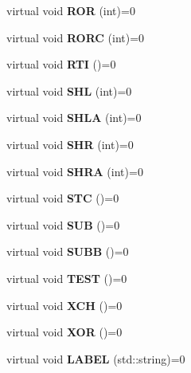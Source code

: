 \begin{DoxyCompactItemize}
\item 
virtual void {\bfseries R\+O\+R} (int)=0\label{classcdk_1_1basic__postfix__emitter_a16c566ba60778cb964c1df8c3cd50bde}

\item 
virtual void {\bfseries R\+O\+R\+C} (int)=0\label{classcdk_1_1basic__postfix__emitter_ae1d0e7b0eb4234b694d7ac3e2bf17b9e}

\item 
virtual void {\bfseries R\+T\+I} ()=0\label{classcdk_1_1basic__postfix__emitter_adedd584bec1b349acaeeea2d6ddd0907}

\item 
virtual void {\bfseries S\+H\+L} (int)=0\label{classcdk_1_1basic__postfix__emitter_a21d9b8518e41b200699c5f84012ee705}

\item 
virtual void {\bfseries S\+H\+L\+A} (int)=0\label{classcdk_1_1basic__postfix__emitter_a9227abe7c4a415b67aac9e38affb90a9}

\item 
virtual void {\bfseries S\+H\+R} (int)=0\label{classcdk_1_1basic__postfix__emitter_a06a2289095b1a45e1dbe1575cd78cc03}

\item 
virtual void {\bfseries S\+H\+R\+A} (int)=0\label{classcdk_1_1basic__postfix__emitter_a8351461f83386d6865a3ff1b8a5f6c24}

\item 
virtual void {\bfseries S\+T\+C} ()=0\label{classcdk_1_1basic__postfix__emitter_a7476ce1ea0dd76b4250e4406f14ef164}

\item 
virtual void {\bfseries S\+U\+B} ()=0\label{classcdk_1_1basic__postfix__emitter_af396160c6fe8d66e96244b825e0a6243}

\item 
virtual void {\bfseries S\+U\+B\+B} ()=0\label{classcdk_1_1basic__postfix__emitter_a7a96b8a16148b51b2f6f04d9e80226f6}

\item 
virtual void {\bfseries T\+E\+S\+T} ()=0\label{classcdk_1_1basic__postfix__emitter_a944645da0e07dddaaab64806168dbc81}

\item 
virtual void {\bfseries X\+C\+H} ()=0\label{classcdk_1_1basic__postfix__emitter_ae383aa17f0100e5888be13f82df561c0}

\item 
virtual void {\bfseries X\+O\+R} ()=0\label{classcdk_1_1basic__postfix__emitter_a4f81d834e05b994699cffbee1f3e3aad}

\item 
virtual void {\bfseries L\+A\+B\+E\+L} (std\+::string)=0\label{classcdk_1_1basic__postfix__emitter_a538fc78f19108ec1635246825ecb16fa}

\end{DoxyCompactItemize}
